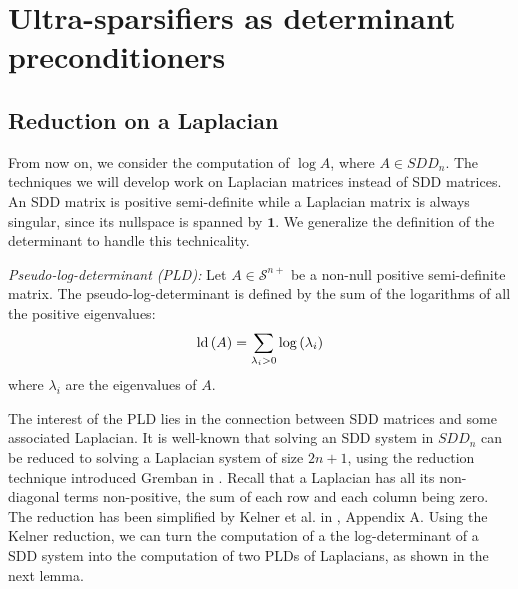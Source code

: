 
\section{Ultra-sparsifiers as determinant preconditioners}


\subsection{Reduction on a Laplacian}

\label{sec:Making-the-problem}

From now on, we consider the computation of $\log A$, where $A\in SDD_{n}$.
The techniques we will develop work on Laplacian matrices instead
of SDD matrices. An SDD matrix is positive semi-definite while a Laplacian
matrix is always singular, since its nullspace is spanned by $\mathbf{1}$.
We generalize the definition of the determinant to handle this technicality.

\begin{definition} \emph{Pseudo-log-determinant (PLD):} Let $A\in\mathcal{S}^{n+}$
be a non-null positive semi-definite matrix. The pseudo-log-determinant
is defined by the sum of the logarithms of all the positive eigenvalues:
\[
\text{\textnormal{ld}}\left(A\right)=\sum_{\lambda_{i}>0}\log\left(\lambda_{i}\right)
\]
where $\lambda_{i}$ are the eigenvalues of $A$. \end{definition}

The interest of the PLD lies in the connection between SDD matrices
and some associated Laplacian. It is well-known that solving an SDD
system in $SDD_{n}$ can be reduced to solving a Laplacian system
of size $2n+1$, using the reduction technique introduced Gremban
in \cite{Gremban1996}. Recall that a Laplacian has all its non-diagonal
terms non-positive, the sum of each row and each column being zero.
The reduction has been simplified by Kelner et al. in \cite{kelner2013simple},
Appendix A. Using the Kelner reduction, we can turn the computation
of a the log-determinant of a SDD system into the computation of two
PLDs of Laplacians, as shown in the next lemma.

